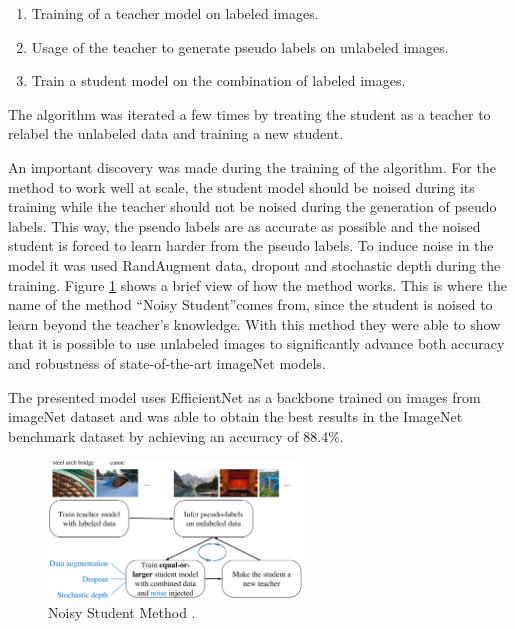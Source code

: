 \begin{enumerate}
    \item Training of a teacher model on labeled images.
    \item Usage of the teacher to generate pseudo labels on unlabeled images.
    \item Train a student model on the combination of labeled images.
\end{enumerate}

\par The algorithm was iterated a few times by treating the student as a teacher to relabel the unlabeled data and training a new student.

\par An important discovery was made during the training of the algorithm. For the method to work well at scale, the student model should be noised during its training while the teacher should not be noised during the generation of pseudo labels. This way, the pseudo labels are as accurate as possible and the noised student is forced to learn harder from the pseudo labels. To induce noise in the model it was used RandAugment data, dropout and stochastic depth during the training. Figure \ref{fig:noisestudent} shows a brief view of how the method works. This is where the name of the method \enquote{Noisy Student}comes from, since the student is noised to learn beyond the teacher's knowledge. With this method they were able to show that it is possible to use unlabeled images to significantly advance both accuracy and robustness of state-of-the-art imageNet models.
\par The presented model uses EfficientNet as a backbone trained on images from imageNet dataset and was able to obtain the best results in the ImageNet benchmark dataset by achieving an accuracy of 88.4\%.



\begin{figure}[H]
    \centering
    \captionsetup{justification=centering}
    \includegraphics[width=0.6\textwidth]{Sections/2StateOfTheArt/2_images/noisy_student.png}
    \caption[Noisy Student Method]{Noisy Student Method \cite{Xie2019}.} 
    \label{fig:noisestudent}
\end{figure}

